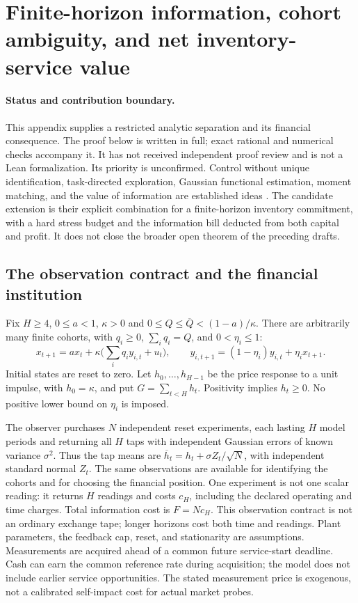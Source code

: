 \section*{Finite-horizon information, cohort ambiguity, and net inventory-service value}

\paragraph{Status and contribution boundary.}
This appendix supplies a restricted analytic separation and its financial
consequence. The proof below is written in full; exact rational and numerical
checks accompany it. It has not received independent proof review and is not
a Lean formalization. Its priority is unconfirmed. Control without unique
identification, task-directed exploration, Gaussian functional estimation,
moment matching, and the value of information are established ideas
\citep{fhc:waarde,fhc:wagenmaker,fhc:donoho,fhc:heinrich,fhc:blackwell}.
The candidate extension is their explicit combination for a finite-horizon
inventory commitment, with a hard stress budget and the information bill
deducted from both capital and profit. It does not close the broader open
theorem of the preceding drafts.

\subsection*{The observation contract and the financial institution}
Fix $H\ge4$, $0\le a<1$, $\kappa>0$ and
$0\le Q\le\overline Q<(1-a)/\kappa$. There are arbitrarily many finite
cohorts, with $q_i\ge0$, $\sum_iq_i=Q$, and $0<\eta_i\le1$:
\[
 x_{t+1}=a x_t+\kappa\bigl(\sum_iq_i y_{i,t}+u_t\bigr),\qquad
 y_{i,t+1}=(1-\eta_i)y_{i,t}+\eta_i x_{t+1}.
\]
Initial states are reset to zero. Let $h_0,\ldots,h_{H-1}$ be the price
response to a unit impulse, with $h_0=\kappa$, and put
$G=\sum_{t<H}h_t$. Positivity implies $h_t\ge0$.
No positive lower bound on $\eta_i$ is imposed.

The observer purchases $N$ independent reset experiments, each lasting $H$
model periods and returning all $H$ taps with independent Gaussian errors of
known variance $\sigma^2$. Thus the tap means are
$\overline h_t=h_t+\sigma Z_t/\sqrt N$, with independent standard normal
$Z_t$. The same observations are available for identifying the cohorts and
for choosing the financial position. One experiment is not one scalar reading:
it returns $H$ readings and costs $c_H$, including the declared operating and
time charges. Total information cost is $F=Nc_H$. This observation contract
is not an ordinary exchange tape; longer horizons cost both time and readings.
Plant parameters, the feedback cap, reset, and stationarity are assumptions.
Measurements are acquired ahead of a common future service-start deadline.
Cash can earn the common reference rate during acquisition; the model does
not include earlier service opportunities. The stated measurement price is
exogenous, not a calibrated self-impact cost for actual market probes.

